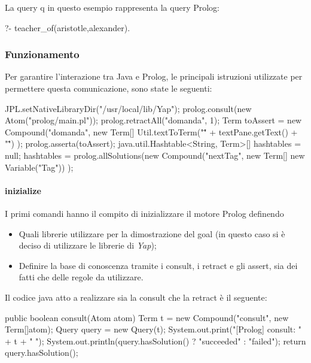 La query q in questo esempio rappresenta la query Prolog:

\begin{prologcode}
  ?- teacher_of(aristotle,alexander).
\end{prologcode}

\subsubsection{Funzionamento}
Per garantire l'interazione tra Java e Prolog, le principali istruzioni utilizzate per permettere questa comunicazione, sono state le seguenti:

\begin{javacode}
  JPL.setNativeLibraryDir("/usr/local/lib/Yap");
  prolog.consult(new Atom("prolog/main.pl"));
  prolog.retractAll("domanda", 1);
  Term toAssert = new Compound("domanda", 
                  new Term[]{
                     Util.textToTerm("\"" + textPane.getText() + "\"")}
                  );
  prolog.asserta(toAssert);
  java.util.Hashtable<String, Term>[] hashtables = null;
  hashtables = prolog.allSolutions(new Compound("nextTag", 
                                  new Term[]{
                                      new Variable("Tag")})
                                      );  
\end{javacode}
\paragraph{inizialize}
I primi comandi hanno il compito di inizializzare il motore Prolog definendo 
\begin{itemize}
    \item Quali librerie utilizzare per la dimostrazione del goal (in questo caso si è deciso di utilizzare le librerie di \emph{Yap});
    \item Definire la base di conoscenza tramite i consult, i retract e gli assert, sia dei fatti che delle regole da utilizzare.
\end{itemize}
Il codice java atto a realizzare sia la consult che la retract è il seguente:

\begin{javacode}
  public boolean consult(Atom atom) {
    Term t = new Compound("consult", new Term[]{atom});
    Query query = new Query(t);
    System.out.print("[Prolog] consult: " + t + " ");
    System.out.println(query.hasSolution() ? "succeeded" : "failed");
    return query.hasSolution();
  }
\end{javacode}


